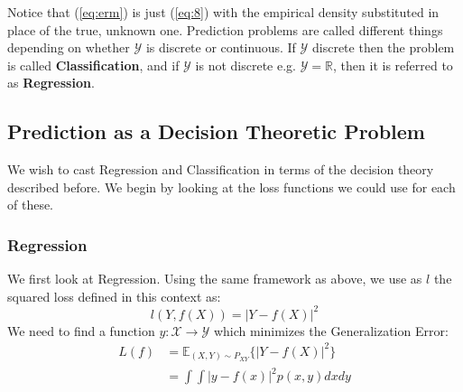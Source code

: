 \documentclass[]{article}
\theoremstyle{mattstyle}
\theoremstyle{definition}
\begin{document}
Notice that (\ref{eq:erm}) is just (\ref{eq:8}) with the empirical density substituted in place of the true, unknown one. Prediction problems are called different things depending on whether $\mathcal{Y}$ is discrete or continuous. If $\mathcal{Y}$ discrete then the problem is called \textbf{Classification}, and if $\mathcal{Y}$ is not discrete e.g. $\mathcal{Y} = \mathbb{R}$, then it is referred to as \textbf{Regression}.  

\subsection{Prediction as a Decision Theoretic Problem}
We wish to cast Regression and Classification in terms of the decision theory described before. We begin by looking at the loss functions we could use for each of these.

\subsubsection{Regression}
We first look at Regression. Using the same framework as above, we use as $l$ the squared loss defined in this context as: $$l(Y, f(X)) = | Y - f(X) |^2$$
We need to find a function $y: \mathcal{X} \rightarrow \mathcal{Y}$ which minimizes the Generalization Error:
\begin{align*}
L(f) &= \mathbb{E}_{(X,Y)\sim P_{XY}}\{| Y - f(X) |^2\}\\
&= \int \int | y - f(x) |^2 p(x, y) dx dy
\end{align*}
\end{document}
